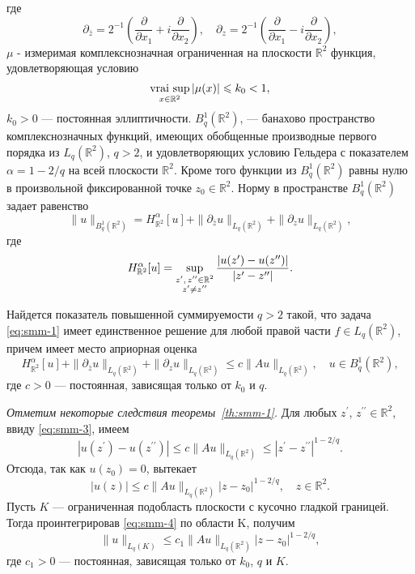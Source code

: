 	где 
	$$
	\partial_{\bar{z}}=2^{-1}\left(\frac{\partial}{\partial x_1}+i\frac{\partial}{\partial x_2}\right),\quad \partial_{z}=2^{-1}\left(\frac{\partial}{\partial x_1}-i\frac{\partial}{\partial x_2}\right),
	$$
	 $\mu$ - измеримая комплекснозначная ограниченная на плоскости $\mathbb{R}^2$ функция, удовлетворяющая условию
\begin{equation}\label{eq:smm-2}
\mathop{\rm vrai\ sup}_{x\in \mathbb{R}^2} |\mu(x)|\leqslant k_0<1,
\end{equation}      
	$k_0>0$ --- постоянная эллиптичности.
	$B_q^1 (\mathbb{R}^2)$, --- банахово пространство комплекснозначных функций, имеющих обобщенные производные первого порядка из $L_q (\mathbb{R}^2)$, $q>2$, и удовлетворяющих условию Гельдера с показателем $\alpha=1-2/q$  на всей плоскости $\mathbb{R}^2$. Кроме того функции из $B_q^1 (\mathbb{R}^2)$ равны нулю в произвольной фиксированной точке $z_0\in \mathbb{R}^2$. Норму в пространстве $B_q^1 (\mathbb{R}^2)$ задает равенство
	$$\|u\|_{B_q^1 (\mathbb{R}^2)}=H_{\mathbb{R}^2}^\alpha [u]+\|\partial_{\bar{z} }u\|_{L_q (\mathbb{R}^2)}+\|\partial_z u\|_{L_q (\mathbb{R}^2)},$$
	где
	$$H_{{\mathbb{R}^2}}^\alpha [u]=\mathop{\rm sup}\limits_{\substack {z^\prime,\, z^{\prime\prime}\in\mathbb{R}^2\\z^\prime\ne z^{\prime\prime}}}\frac{|u(z^\prime
		)-u(z^{\prime\prime})|}{|z^\prime-z^{\prime\prime}|}.$$
	
	\begin{theorem}\label{th:smm-1}
		Найдется показатель повышенной суммируемости $q>2$ такой, что задача \eqref{eq:smm-1} имеет единственное решение для любой правой части $f\in L_q(\mathbb{R}^2)$, причем имеет место априорная оценка 
	\begin{equation}\label{eq:smm-3}
	H_{\mathbb{R}^2}^\alpha [u]+\|\partial_{\bar{z} }u\|_{L_q (\mathbb{R}^2)}+\|\partial_z u\|_{L_q (\mathbb{R}^2)}\leqslant c\|Au\|_{L_q(\mathbb{R}^2)}, \quad u\in B_q^1({\mathbb R}^2),
	\end{equation}
		где $c >0$ --- постоянная, зависящая только от $k_0$ и $q$. 
	\end{theorem}
	
	\textit{Отметим некоторые следствия теоремы~\ref{th:smm-1}.} Для любых  $z^\prime$, $z^{\prime\prime}\in {\mathbb R}^2$, ввиду \eqref{eq:smm-3}, имеем
	$$|u(z^\prime)-u(z^{\prime\prime})| \leqslant c\|Au\|_{L_q ({\mathbb R}^2) }\leqslant |z^\prime-z^{\prime\prime}|^{1-2/q}.$$
	Отсюда, так как $u(z_0 )=0$, вытекает
	\begin{equation}\label{eq:smm-4}
|u(z)|\leqslant c\|Au\|_{L_q ({\mathbb R}^2 )} |z-z_0 |^{1-2/q},\quad z\in {\mathbb R}^2.
\end{equation}                           
	Пусть $K$ --- ограниченная подобласть плоскости с кусочно гладкой границей. Тогда проинтегрировав \eqref{eq:smm-4} по области K, получим
\begin{equation*}%
\|u\|_{L_q (K) }\leqslant c_1 \|Au\|_{L_q ({\mathbb R}^2 )}|z-z_0|^{1-2/q}, 
\end{equation*}                                      
	где $c_1>0$ --- постоянная, зависящая только от $k_0$, $q$ и $K$.

